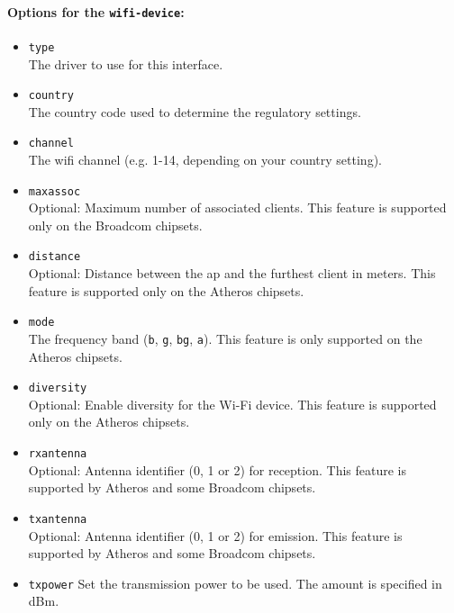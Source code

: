 \paragraph{Options for the \texttt{wifi-device}:}

\begin{itemize}
    \item \texttt{type} \\
        The driver to use for this interface.
	
    \item \texttt{country} \\
        The country code used to determine the regulatory settings.

    \item \texttt{channel} \\
        The wifi channel (e.g. 1-14, depending on your country setting).

    \item \texttt{maxassoc} \\
        Optional: Maximum number of associated clients. This feature is supported only on the Broadcom chipsets.

    \item \texttt{distance} \\
	Optional: Distance between the ap and the furthest client in meters. This feature is supported only on the Atheros chipsets.

	\item \texttt{mode} \\
		The frequency band (\texttt{b}, \texttt{g}, \texttt{bg}, \texttt{a}). This feature is only supported on the Atheros chipsets.

    \item \texttt{diversity} \\
	Optional: Enable diversity for the Wi-Fi device. This feature is supported only on the Atheros chipsets.

    \item \texttt{rxantenna} \\
	Optional: Antenna identifier (0, 1 or 2) for reception. This feature is supported by Atheros and some Broadcom chipsets.

    \item \texttt{txantenna} \\
	Optional: Antenna identifier (0, 1 or 2) for emission. This feature is supported by Atheros and some Broadcom chipsets.

    \item \texttt{txpower}
	Set the transmission power to be used. The amount is specified in dBm.

\end{itemize}

